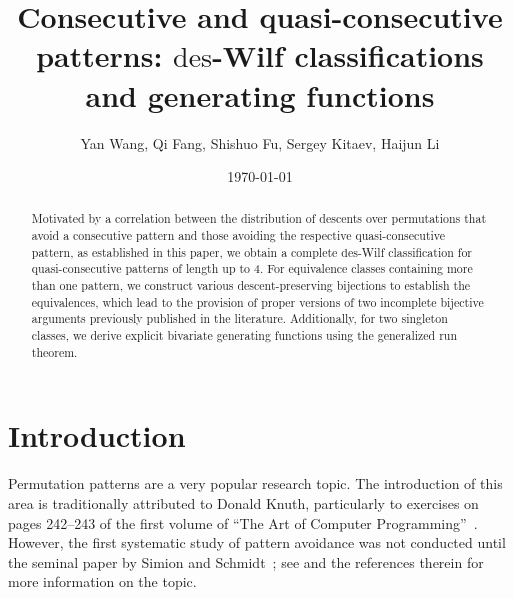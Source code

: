 \documentclass[11pt,reqno]{amsart}
\numberwithin{equation}{section}
\theoremstyle{plain}
\theoremstyle{definition}
\def\des{\mathrm{des}}
\begin{document}
\title[Consecutive and quasi-consecutive patterns]{Consecutive and quasi-consecutive patterns: $\mathrm{des}$-Wilf classifications and generating functions}


\author[Y. Wang, Q.Fang, S. Fu, S. Kitaev, H. Li]{Yan Wang, Qi Fang, Shishuo Fu, Sergey Kitaev, Haijun Li}
\address[Yan Wang]{College of Mathematics and Statistics, Chongqing University, Chongqing 401331, P.R. China}
\address[Qi Fang]{College of Mathematics and Statistics, Chongqing University, Chongqing 401331, P.R. China}
\address[Shishuo Fu]{College of Mathematics and Statistics, Chongqing University, Chongqing 401331, P.R. China}
\address[Sergey Kitaev]{Department of Mathematics and Statistics, University of Strathclyde, 26 Richmond Street, Glasgow G1 1XH, UK}
\address[Haijun Li]{College of Mathematics and Statistics, Chongqing University, Chongqing 401331, P.R. China}

\date{\today}

\begin{abstract}
Motivated by a correlation between the distribution of descents over permutations that avoid a consecutive pattern and those avoiding the respective quasi-consecutive pattern, as established in this paper, we obtain a complete $\des$-Wilf classification for quasi-consecutive patterns of length up to 4. For equivalence classes containing more than one pattern, we construct various descent-preserving bijections to establish the equivalences, which lead to the provision of proper versions of two incomplete bijective arguments previously published in the literature. Additionally, for two singleton classes, we derive explicit bivariate generating functions using the generalized run theorem.
\end{abstract}

\maketitle

\section{Introduction}


Permutation patterns are a very popular research topic. The introduction of this area is traditionally attributed to 
Donald Knuth, particularly to exercises on pages 242--243 of the first volume of ``The Art of Computer Programming''~\cite{knu75}. However, the first
systematic study of pattern avoidance was not conducted until the seminal paper by Simion and Schmidt~\cite{SS85}; see \cite{kit11} and the references therein for more information on the topic. 
\end{document}
